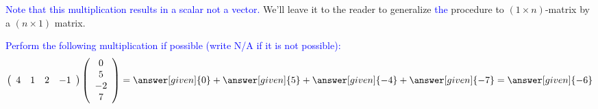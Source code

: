 \documentclass{ximera}
\begin{document}
\begin{center}
\end{center}
\textcolor{blue}{Note that this multiplication results in a scalar not a vector.} We'll leave it to the reader to generalize \textcolor{blue}{the} procedure to $(1\times n)$-matrix by a $(n\times 1)$ matrix.

\begin{question}
 \textcolor{blue}{Perform the following multiplication if possible (write N/A if it is not possible):
 \[
 \left(\begin{array}{cccc}
 4 & 1 & 2 & -1
 \end{array}\right)\left(\begin{array}{c}
 0\\
 5\\
 -2\\
 7
 \end{array}\right) = \answer[given]{0} + \answer[given]{5}+\answer[given]{-4} + \answer[given]{-7} = \answer[given]{-6}
 \]
 }
\end{question}
\end{document}
